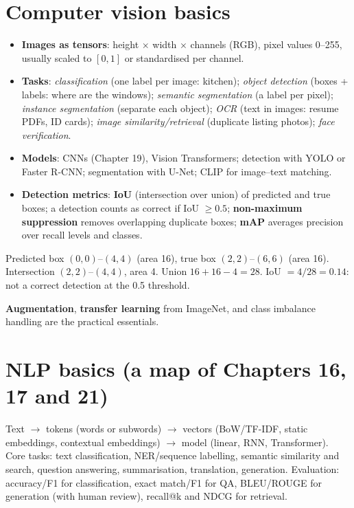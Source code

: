 \section{Computer vision basics}
\begin{itemize}
\item \textbf{Images as tensors}: height $\times$ width $\times$ channels (RGB), pixel values 0--255, usually scaled to $[0,1]$ or standardised per channel.
\item \textbf{Tasks}: \emph{classification} (one label per image: kitchen); \emph{object detection} (boxes + labels: where are the windows); \emph{semantic segmentation}
  (a label per pixel); \emph{instance segmentation} (separate each object); \emph{OCR} (text in images: resume PDFs, ID cards); \emph{image similarity/retrieval}
  (duplicate listing photos); \emph{face verification}.
\item \textbf{Models}: CNNs (Chapter 19), Vision Transformers; detection with YOLO or Faster R-CNN; segmentation with U-Net; CLIP for image--text matching.
\item \textbf{Detection metrics}: \textbf{IoU} (intersection over union) of predicted and true boxes; a detection counts as correct if IoU $\ge0.5$; \textbf{non-maximum
  suppression} removes overlapping duplicate boxes; \textbf{mAP} averages precision over recall levels and classes.
\end{itemize}
\begin{example}[: IoU]
Predicted box $(0,0)$--$(4,4)$ (area 16), true box $(2,2)$--$(6,6)$ (area 16). Intersection $(2,2)$--$(4,4)$, area 4. Union $16 + 16 - 4 = 28$. IoU $= 4/28 = 0.14$: not a
correct detection at the 0.5 threshold.
\end{example}
\textbf{Augmentation}, \textbf{transfer learning} from ImageNet, and class imbalance handling are the practical essentials.

\section{NLP basics (a map of Chapters 16, 17 and 21)}
Text $\to$ tokens (words or subwords) $\to$ vectors (BoW/TF-IDF, static embeddings, contextual embeddings) $\to$ model (linear, RNN, Transformer). Core tasks: text
classification, NER/sequence labelling, semantic similarity and search, question answering, summarisation, translation, generation. Evaluation: accuracy/F1 for
classification, exact match/F1 for QA, BLEU/ROUGE for generation (with human review), recall@k and NDCG for retrieval.

